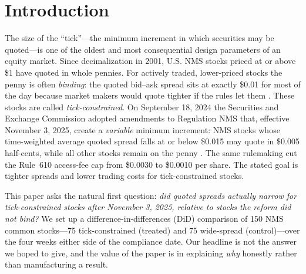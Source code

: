 \documentclass[12pt]{article}
\begin{document}
\begin{abstract}
price/liquidity structure of \emph{which} stocks are treated, not the reform. \emph{Power:}
at 80\% power the design detects a $0.49$~bps narrowing, below the $\approx\!1.0$~bps a
half-cent move would produce at the median treated price---so the effect would be
detectable \emph{if} the daily close could take half-cent values, which the censoring table
shows it never does. We report a transparent, measurement-limited \textbf{null} and specify
the TAQ intraday test required to answer the question. \\[4pt]
\noindent\textbf{JEL:} G14, G18, G12, G28. \quad
\textbf{Keywords:} tick size, minimum pricing increment, access fees, bid--ask spread,
Regulation NMS, difference-in-differences, randomization inference, statistical power,
market microstructure.
\end{abstract}

\section{Introduction}
The size of the ``tick''---the minimum increment in which securities may be quoted---is one
of the oldest and most consequential design parameters of an equity market. Since
decimalization in 2001, U.S. NMS stocks priced at or above \$1 have quoted in whole
pennies. For actively traded, lower-priced stocks the penny is often \emph{binding}: the
quoted bid--ask spread sits at exactly \$0.01 for most of the day because market makers
would quote tighter if the rules let them \citep{harris1994,ohara2019}. These stocks are
called \emph{tick-constrained}. On September 18, 2024 the Securities and Exchange
Commission adopted amendments to Regulation NMS that, effective November 3, 2025, create a
\emph{variable} minimum increment: NMS stocks whose time-weighted average quoted spread
falls at or below \$0.015 may quote in \$0.005 half-cents, while all other stocks remain on
the penny \citep{sec2024}. The same rulemaking cut the Rule~610 access-fee cap from
\$0.0030 to \$0.0010 per share. The stated goal is tighter spreads and lower trading costs
for tick-constrained stocks.

This paper asks the natural first question: \emph{did quoted spreads actually narrow for
tick-constrained stocks after November 3, 2025, relative to stocks the reform did not
bind?} We set up a difference-in-differences (DiD) comparison of 150 NMS common stocks---75
tick-constrained (treated) and 75 wide-spread (control)---over the four weeks either side of
the compliance date. Our headline is not the answer we hoped to give, and the value of the
paper is in explaining \emph{why} honestly rather than manufacturing a result.
\end{document}
